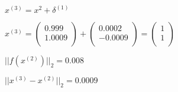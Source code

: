 \documentclass{article}
\begin{document}
\(x^{(3)} = x^{2} + \delta^{(1)}\)

\(
x^{(3)}
=
\begin{pmatrix}
0.999\\
1.0009\\
\end{pmatrix}
+
\begin{pmatrix}
0.0002\\
-0.0009\\
\end{pmatrix}
=
\begin{pmatrix}
1\\
1\\
\end{pmatrix}
\)

\(||f(x^{(2)})||_2 = 0.008\)

\(||x^{(3)}-x^{(2)}||_2 = 0.0009\)
\end{document}
